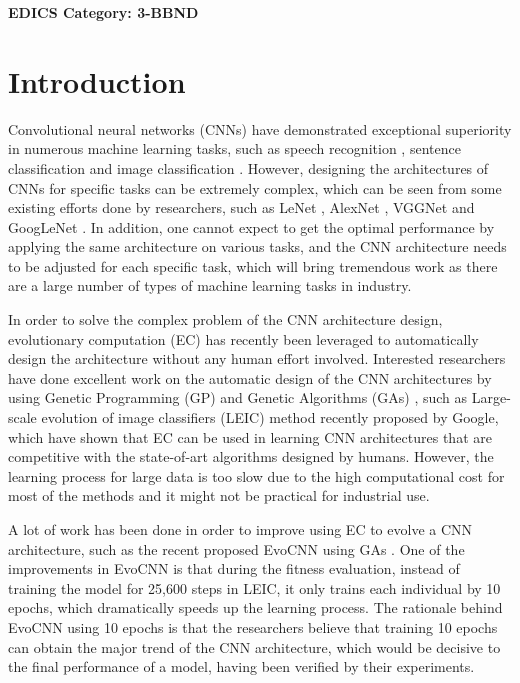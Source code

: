 \documentclass[conference]{IEEEtran}
\begin{document}
\ifCLASSOPTIONpeerreview
\begin{center} \bfseries EDICS Category: 3-BBND \end{center}
\fi
\IEEEpeerreviewmaketitle



\section{Introduction}
Convolutional neural networks (CNNs) have demonstrated exceptional superiority in numerous machine learning tasks, such as speech recognition \cite{CNNspeech:Ossama}, sentence classification \cite{CNNsentence:Yoon} and image classification \cite{ImageNet:Alex}. However, designing the architectures of CNNs for specific tasks can be extremely complex, which can be seen from some existing efforts done by researchers, such as LeNet \cite{ZipcodeRecognition:LeCun}\cite{DocumentRecognition:LeCun}, AlexNet \cite{ImageNet:Alex}, VGGNet \cite{CNNverydeep:Simonyan} and GoogLeNet \cite{CNNdeeper:Szegedy}. %
In addition, one cannot expect to get the optimal performance by applying the same architecture on various tasks, and the CNN architecture needs to be adjusted for each specific task, which will bring tremendous work as there are a large number of types of machine learning tasks in industry.


In order to solve the complex problem of the CNN architecture design, evolutionary computation (EC) has recently been leveraged to automatically design the architecture without any human effort involved. Interested researchers have done excellent work on the automatic design of the CNN architectures by using Genetic Programming (GP) \cite{CNNGP:Suganuma} and Genetic Algorithms (GAs) \cite{CNNevolve:Stanley}, such as Large-scale evolution of image classifiers (LEIC) method \cite{LEIC:Real} recently proposed by Google, which have shown that EC can be used in learning CNN architectures that are competitive with the state-of-art algorithms designed by humans. However, the learning process for large data is too slow due to the high computational cost for most of the methods and it might not be practical for industrial use.


A lot of work has been done in order to improve using EC to evolve a CNN architecture, such as the recent proposed EvoCNN using GAs \cite{EvolveCNN:Yanan}. One of the improvements in EvoCNN is that during the fitness evaluation, instead of training the model for 25,600 steps in LEIC, it only trains each individual by 10 epochs, which dramatically speeds up the learning process. The rationale behind EvoCNN using 10 epochs is that the researchers believe that training 10 epochs can obtain the major trend of the CNN architecture, which would be decisive to the final performance of a model, having been verified by their experiments.
\end{document}
